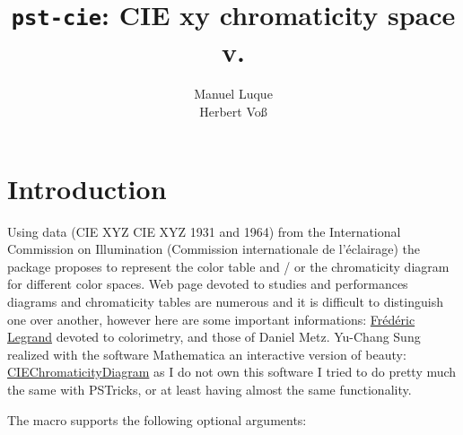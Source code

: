 \documentclass[11pt,english,BCOR=10mm,DIV=12,bibliography=totoc,parskip=false,headings=small,
    headinclude=false,footinclude=false,twoside,english]{pst-doc}
\let\pstFV\fileversion
\begin{document}
\title{\texttt{pst-cie}: CIE xy chromaticity space\\
\small v.\pstFV}
\author{Manuel Luque\\Herbert Voß}
\settitle


\section{Introduction}


Using data (CIE XYZ CIE XYZ 1931 and 1964)
from the International Commission on Illumination (Commission internationale de l’éclairage)
the package   proposes to represent the color table and / or the chromaticity diagram for 
different color spaces. Web page devoted to studies and performances diagrams and chromaticity 
tables are numerous and it is difficult to distinguish one over another, 
however here are some important informations:  
\href{http://www.f-legrand.fr/scidoc/docmml/index.html}{Frédéric Legrand} 
devoted to colorimetry, and those of Daniel Metz. Yu-Chang Sung realized with the software 
\textsf{Mathematica} an interactive version of beauty: 
\href{http://demonstrations.wolfram.com/CIEChromaticityDiagram/}{CIEChromaticityDiagram}
as I do not own this software I tried to do pretty much the same with PSTricks, or at least 
having almost the same functionality.

The macro \OptArgs supports the following optional arguments:
\end{document}
